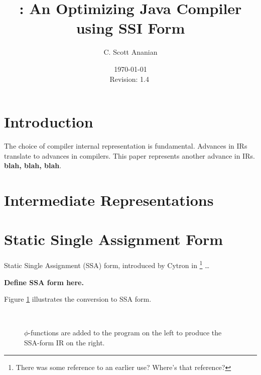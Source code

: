\documentclass[12pt,notitlepage,twoside]{article}
\title{\magic: An Optimizing Java Compiler using SSI Form}
\author{C. Scott Ananian}
\date{\today \\ $ $Revision: 1.4 $ $}
\newcommand{\phifunction}{$\phi$-function}
\begin{document}
\pagestyle{myheadings}


\maketitle

\section{Introduction}
The choice of compiler internal representation is fundamental.
Advances in IRs translate to advances in compilers.
This paper represents another advance in IRs.
\textbf{blah, blah, blah}.

\section{Intermediate Representations}
\section{Static Single Assignment Form}
Static Single Assignment (SSA) form, introduced by Cytron in
\cite{cytron89:ssa}%
\footnote{There was some reference to an earlier use? Where's that reference?}
\ldots

\textbf{Define SSA form here.}

Figure \ref{fig:tossa} illustrates the conversion to SSA form.
\begin{figure}\label{fig:tossa}
\begin{center}
 \vline\ 
\end{center}
\caption{\phifunction{s} are added to the program on the left to
produce the SSA-form IR on the right.}
\end{figure}
\end{document}
